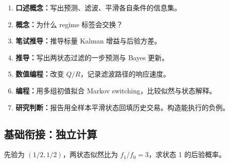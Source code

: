 \begin{enumerate}[leftmargin=*]
  \item \textbf{口述概念：}写出预测、滤波、平滑各自条件的信息集。
  \item \textbf{概念：}为什么 regime 标签会交换？
  \item \textbf{笔试推导：}推导标量 Kalman 增益与后验方差。
  \item \textbf{推导：}写出两状态过滤的一步预测与 Bayes 更新。
  \item \textbf{数值编程：}改变 $Q/R$，记录滤波路径的响应速度。
  \item \textbf{编程：}用多组初值拟合 Markov switching，比较似然与状态解释。
  \item \textbf{研究判断：}报告用全样本平滑状态回填历史交易。构造能执行的负例。
\end{enumerate}

\subsection*{基础衔接：独立计算}
先验为 $(1/2,1/2)$，两状态似然比为 $f_1/f_0=3$，求状态 1 的后验概率。

